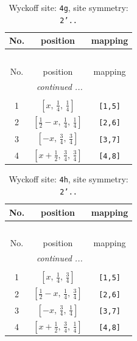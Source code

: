 \documentclass[fleqn,8pt]{jsarticle}
\begin{document}
\renewcommand{\arraystretch}{1.2}
\begin{longtable}{ccc}
\caption{Wyckoff site: {\tt 4g}, site symmetry: {\tt 2'..}}
 \\
 \hline \hline
No. & position & mapping \\ \hline \endfirsthead

\multicolumn{2}{l}{\tablename\ \thetable{}} \\
 \hline \hline
No. & position & mapping \\ \hline \endhead

 \hline \hline
\multicolumn{2}{r}{\footnotesize\it continued ...} \\ \endfoot

 \hline \hline
\multicolumn{2}{r}{} \\ \endlastfoot

1 & $\left[ x,\, \frac{1}{4},\, \frac{1}{4} \right]$ & {\tt [1,5]} \\ \hline
2 & $\left[ \frac{1}{2} - x,\, \frac{1}{4},\, \frac{1}{4} \right]$ & {\tt [2,6]} \\ \hline
3 & $\left[ - x,\, \frac{3}{4},\, \frac{3}{4} \right]$ & {\tt [3,7]} \\ \hline
4 & $\left[ x + \frac{1}{2},\, \frac{3}{4},\, \frac{3}{4} \right]$ & {\tt [4,8]} \\
\end{longtable}
\renewcommand{\arraystretch}{1.2}
\begin{longtable}{ccc}
\caption{Wyckoff site: {\tt 4h}, site symmetry: {\tt 2'..}}
 \\
 \hline \hline
No. & position & mapping \\ \hline \endfirsthead

\multicolumn{2}{l}{\tablename\ \thetable{}} \\
 \hline \hline
No. & position & mapping \\ \hline \endhead

 \hline \hline
\multicolumn{2}{r}{\footnotesize\it continued ...} \\ \endfoot

 \hline \hline
\multicolumn{2}{r}{} \\ \endlastfoot

1 & $\left[ x,\, \frac{1}{4},\, \frac{3}{4} \right]$ & {\tt [1,5]} \\ \hline
2 & $\left[ \frac{1}{2} - x,\, \frac{1}{4},\, \frac{3}{4} \right]$ & {\tt [2,6]} \\ \hline
3 & $\left[ - x,\, \frac{3}{4},\, \frac{1}{4} \right]$ & {\tt [3,7]} \\ \hline
4 & $\left[ x + \frac{1}{2},\, \frac{3}{4},\, \frac{1}{4} \right]$ & {\tt [4,8]} \\
\end{longtable}
\end{document}
